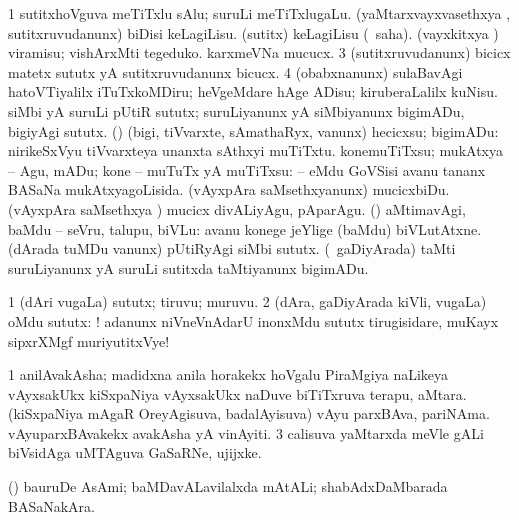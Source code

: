 \noindent
\gl{\pagu}
\expl{}
\bmng
\bnum
\num{1}  sutitxhoVguva meTiTxlu sAlu; suruLi meTiTxlugaLu. 
  
\banum
{} (yaMtarxvayxvasethxya \vi, sutitxruvudanunx) biDisi keLagiLisu. 
 (sutitx) keLagiLisu (\rUpa\ saha). 
 (vayxkitxya \vi) viramisu; vishArxMti tegeduko. 
 karxmeVNa mucucx. 
\eanum
\numie
\num{3}  (sutitxruvudanunx) bicicx matetx sututx yA sutitxruvudanunx bicucx. 
\num{4}  (obabxnanunx) sulaBavAgi hatoVTiyalilx iTuTxkoMDiru; heVgeMdare hAge ADisu; kiruberaLalilx kuNisu. 
  
\banum
{} siMbi yA suruLi pUtiR sututx; suruLiyanunx yA siMbiyanunx bigimADu, bigiyAgi sututx. 
 (\rUpa) (bigi, tiVvarxte, sAmathaRyx, \mo vanunx) hecicxsu; bigimADu:  nirikeSxVyu tiVvarxteya unanxta sAthxyi muTiTxtu. 
 konemuTiTxsu; mukAtxya -- Agu, mADu; kone -- muTuTx yA muTiTxsu:  -- eMdu GoVSisi avanu tananx BASaNa mukAtxyagoLisida. 
 (vAyxpAra saMsethxyanunx) mucicxbiDu. 
 (vAyxpAra saMsethxya \vi) mucicx divALiyAgu, pAparAgu. 
 (\AmA) aMtimavAgi, baMdu -- seVru, talupu, biVLu:  avanu konege jeYlige (baMdu) biVLutAtxne. 
 (dArada tuMDu \mo vanunx) pUtiRyAgi siMbi sututx. 
 (\kanmu\ gaDiyArada) taMti suruLiyanunx yA suruLi sutitxda taMtiyanunx bigimADu. 
\eanum
\numie
\enum
\emng
\eentry

\bentry
{}
\gl{\nA}
\expl{}
\bmng
\bnum
\num{1} (dAri \mo vugaLa) sututx; tiruvu; muruvu. 
\num{2} (dAra, gaDiyArada kiVli, \mo vugaLa) oMdu sututx: ! adanunx niVneVnAdarU inonxMdu sututx tirugisidare, muKayx sipxrXMgf muriyutitxVye! 
\enum
\emng
\eentry

\bentry
{}
\gl{\nA}
\bmng
\bnum
\num{1} anilAvakAsha; madidxna anila horakekx hoVgalu PiraMgiya naLikeya vAyxsakUkx kiSxpaNiya vAyxsakUkx naDuve biTiTxruva terapu, aMtara. 
\banum
{} (kiSxpaNiya mAgaR OreyAgisuva, badalAyisuva) vAyu parxBAva, pariNAma. 
 vAyuparxBAvakekx avakAsha yA vinAyiti. 
\eanum
\numie
\num{3} calisuva yaMtarxda meVle gALi biVsidAga uMTAguva GaSaRNe, ujijxke. 
\enum
\emng
\eentry

\bentry
{}
\gl{\nA}
\bmng
(\AmA) bauruDe AsAmi; baMDavALavilalxda mAtALi; shabAdxDaMbarada BASaNakAra. 
\emng
\eentry

